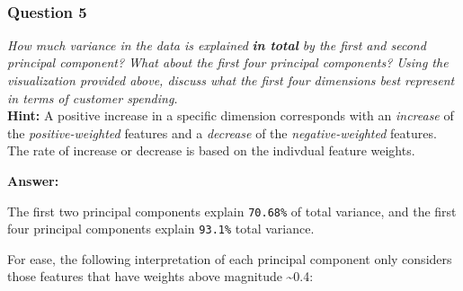 \documentclass{article}
\begin{document}
    \begin{center}
    \end{center}
    { \hspace*{\fill} \\}
    
    \subsubsection{Question 5}\label{question-5}

\emph{How much variance in the data is explained} \textbf{\emph{in
total}} \emph{by the first and second principal component? What about
the first four principal components? Using the visualization provided
above, discuss what the first four dimensions best represent in terms of
customer spending.}\\
\textbf{Hint:} A positive increase in a specific dimension corresponds
with an \emph{increase} of the \emph{positive-weighted} features and a
\emph{decrease} of the \emph{negative-weighted} features. The rate of
increase or decrease is based on the indivdual feature weights.

    \textbf{Answer:}

The first two principal components explain \texttt{70.68\%} of total
variance, and the first four principal components explain
\texttt{93.1\%} total variance.

For ease, the following interpretation of each principal component only
considers those features that have weights above magnitude
\textasciitilde{}0.4:
\end{document}
